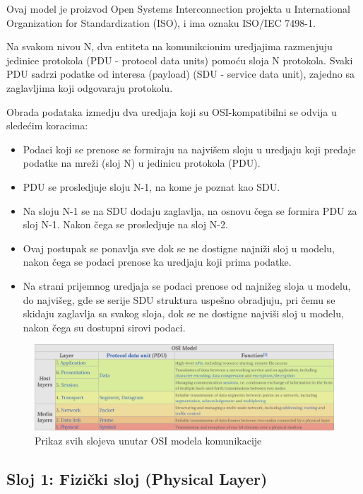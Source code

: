 \documentclass[a4paper,12pt, master]{etf}
\begin{document}
	Ovaj model je proizvod Open Systems Interconnection projekta u
	International Organization for Standardization (ISO), i ima oznaku ISO/IEC
	7498-1.

	Na svakom nivou N, dva entiteta na komunikcionim uredjajima razmenjuju
	jedinice protokola (PDU - protocol data units) pomo\'{c}u sloja N
	protokola. Svaki PDU sadrzi podatke od interesa	(payload) (SDU - service
	data unit), zajedno sa zaglavljima koji odgovaraju protokolu.

	Obrada podataka izmedju dva uredjaja koji su OSI-kompatibilni se odvija u
	slede\'{c}im koracima:

	\begin{itemize}
		\item Podaci koji se prenose se formiraju na najvi\v{s}em sloju u
		uredjaju koji predaje podatke na mre\v{z}i (sloj N) u jedinicu
		protokola (PDU).
		\item PDU se prosledjuje sloju N-1, na kome je poznat kao SDU.
		\item Na sloju N-1 se na SDU dodaju zaglavlja, na osnovu \v{c}ega se
		formira PDU za sloj N-1. Nakon \v{c}ega se prosledjuje na sloj N-2.
		\item Ovaj postupak se ponavlja sve dok se ne dostigne najni\v{z}i sloj
		u modelu, nakon	\v{c}ega se podaci prenose ka uredjaju koji prima
		podatke.
		\item Na strani prijemnog uredjaja se podaci prenose od najni\v{z}eg
		sloja u modelu, do najvi\v{s}eg, gde se serije SDU struktura
		uspe\v{s}no obradjuju, pri \v{c}emu se skidaju zaglavlja sa svakog
		sloja, dok se ne dostigne najvi\v{s}i sloj u modelu, nakon \v{c}ega su
		dostupni sirovi podaci.
	\end{itemize}

	\begin{figure}[htb]
		\centering
		\includegraphics[scale=.43]{../pic/osi_model.png}
		\caption{Prikaz svih slojeva unutar OSI modela komunikacije}
		\label{fig:osi_model}
	\end{figure}

	\subsection{Sloj 1: Fizi\v{c}ki sloj (Physical Layer)}
\end{document}
